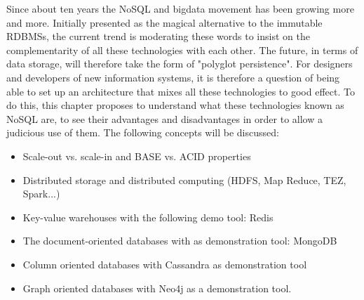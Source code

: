Since about ten years the NoSQL and bigdata movement has been growing more and more. Initially presented as the magical alternative to the immutable RDBMSs, the current trend is moderating these words to insist on the complementarity of all these technologies with each other. The future, in terms of data storage, will therefore take the form of "polyglot persistence". For designers and developers of new information systems, it is therefore a question of being able to set up an architecture that mixes all these technologies to good effect. To do this, this chapter proposes to understand what these technologies known as NoSQL are, to see their advantages and disadvantages in order to allow a judicious use of them. The following concepts will be discussed:
\begin{itemize}
    \item Scale-out vs. scale-in and BASE vs. ACID properties
    \item Distributed storage and distributed computing (HDFS, Map Reduce, TEZ, Spark...)
    \item Key-value warehouses with the following demo tool: Redis
    \item The document-oriented databases with as demonstration tool: MongoDB
    \item Column oriented databases with Cassandra as demonstration tool
    \item Graph oriented databases with Neo4j as a demonstration tool.
\end{itemize}